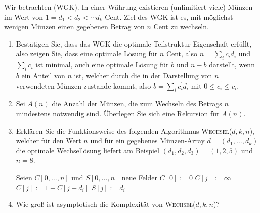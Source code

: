 
\begin{exercise}

Wir betrachten  (WGK).
In einer Währung existieren (unlimitiert viele) Münzen im Wert von $1 = d_1 < d_2 < \cdots  d_k$ Cent.
Ziel des WGK ist es, mit möglichst wenigen Münzen einen gegebenen Betrag von $n$ Cent zu wechseln.

\begin{enumerate}[label = \alph*]

  \item Bestätigen Sie, dass das WGK die optimale Teilstruktur-Eigenschaft erfüllt, also zeigen Sie, dass eine optimale Lösung für $n$ Cent, also $n = \sum_{i} c_i d_i$ und $\sum_i c_i$ ist minimal, auch eine optimale Lösung für $b$ und $n - b$ darstellt, wenn $b$ ein Anteil von $n$ ist, welcher durch die in der Darstellung von $n$ verwendeten Münzen zustande kommt, also $b = \sum_i c_i^\prime d_i$ mit $0 \leq c_i^\prime \leq c_i$.

  \item Sei $A(n)$ die Anzahl der Münzen, die zum Wechseln des Betrags $n$ mindestens notwendig sind.
  Überlegen Sie sich eine Rekursion für $A(n)$.

  \item Erklären Sie die Funktionsweise des folgenden Algorithmus \textsc{Wechsel}($d, k, n$), welcher für den Wert $n$ und für ein gegebenes Münzen-Array $d = (d_1, \dots, d_k)$ die optimale Wechsellösung liefert am Beispiel $(d_1, d_2, d_3) = (1, 2, 5)$ und $n = 8$.
  
  \phantom{}

  \begin{algorithmic}
      \State Seien $C[0, \dots, n]$ und $S[0, \dots, n]$ neue Felder
      \State $C[0] := 0$
        \State $C[j] := \infty$
            \State $C[j] := 1 + C[j - d_i]$
            \State $S[j] := d_i$
          \EndIf
        \EndFor
      \EndFor
    \EndProcedure
  \end{algorithmic}

  \phantom{}

  \item Wie groß ist asymptotisch die Komplexität von \textsc{Wechsel}($d, k, n$)?

\end{enumerate}


\end{exercise}


